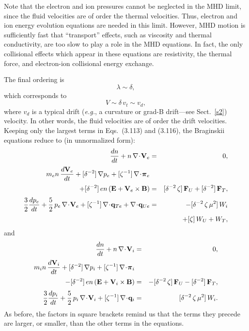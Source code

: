 Note that the electron and ion pressures cannot be neglected in the MHD
limit, since the fluid velocities are of order the thermal
velocities. Thus, electron and ion energy evolution equations are needed
in this limit. However, MHD motion is sufficiently fast that 
``transport'' effects, such as viscosity and thermal conductivity,
are too slow to  play
a role in the MHD equations. In fact, the only collisional effects
which appear in these equations are resistivity, the thermal force, and
electron-ion collisional energy exchange. 

The final ordering is
\begin{equation}\label{e3.128}
\lambda\sim \delta,
\end{equation}
which corresponds to
\begin{equation}
V \sim \delta\,v_t \sim v_d,
\end{equation}
where $v_d$ is a typical drift ({\em e.g.}, a curvature or grad-B
drift---see Sect.~\ref{s2}) velocity. In other words, the fluid velocities
are of order the drift velocities. Keeping only the
largest terms in Eqs.~(3.113) and (3.116), the Braginskii equations reduce to
(in unnormalized form):
\begin{eqnarray}\label{e3.130a}
\frac{dn}{dt} + n\,\nabla\!\cdot\!{\bf V}_e &=& 0,\\[0.5ex]
m_e n\,\frac{d {\bf V}_e}{dt} + [\delta^{-2}]\,\nabla p_e+
[\zeta^{-1}]\, \nabla\!\cdot \!\bpi_e &&\\[0.5ex]
+ [\delta^{-2}]\,e n\,
({\bf E} + {\bf V}_e\times {\bf B})& =&[\delta^{-2}\,\zeta]\, {\bf F}_U + [\delta^{-2}]\,
{\bf F}_T,\nonumber\\[0.5ex]
\frac{3}{2}\frac{d p_e}{dt} + \frac{5}{2}\,p_e\,\nabla\!\cdot\!{\bf V}_e
+ [\zeta^{-1}]\,\nabla\!\cdot\!{\bf q}_{Te}
+ \nabla\!\cdot\!{\bf q}_{Ue} &=&-[\delta^{-2}\,\zeta\,\mu^2]\, W_i\\[0.5ex]
&&+[\zeta]\,W_U + W_T,\nonumber\label{e3.130c}
\end{eqnarray}
and
\begin{eqnarray}\label{e3.131a}
\frac{dn}{dt} + n\,\nabla\!\cdot\!{\bf V}_i &=& 0,\\[0.5ex]
m_i n\,\frac{d {\bf V}_i}{dt} + [\delta^{-2}]\,\nabla p_i + 
[\zeta^{-1}]\,\nabla\!\cdot \!\bpi_i &&\\[0.5ex]
- [\delta^{-2}]\,e n\,
({\bf E} + {\bf V}_i\times {\bf B})& =& -[\delta^{-2}\,\zeta]\, {\bf F}_U - [\delta^{-2}]\,{\bf F}_T,
\nonumber\\[0.5ex]
\frac{3}{2}\frac{d p_i}{dt} + \frac{5}{2}\,p_i\,\nabla\!\cdot\!{\bf V}_i
+ [\zeta^{-1}]\,\nabla\!\cdot\!{\bf q}_i &=& [\delta^{-2}\,\zeta\,\mu^2]\,W_i.\label{e3.131c}
\end{eqnarray}
As before, the factors in square brackets remind us that the terms they
precede are larger, or smaller, than the other terms in the equations. 

